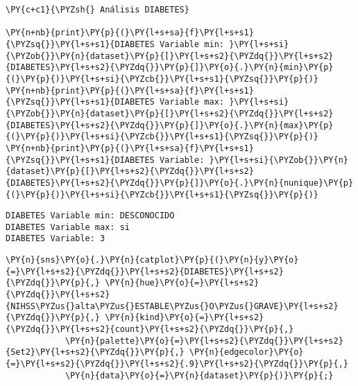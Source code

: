     \begin{tcolorbox}[breakable, size=fbox, boxrule=1pt, pad at break*=1mm,colback=cellbackground, colframe=cellborder]
\begin{Verbatim}[commandchars=\\\{\}]
\PY{c+c1}{\PYZsh{} Análisis DIABETES}

\PY{n+nb}{print}\PY{p}{(}\PY{l+s+sa}{f}\PY{l+s+s1}{\PYZsq{}}\PY{l+s+s1}{DIABETES Variable min: }\PY{l+s+si}{\PYZob{}}\PY{n}{dataset}\PY{p}{[}\PY{l+s+s2}{\PYZdq{}}\PY{l+s+s2}{DIABETES}\PY{l+s+s2}{\PYZdq{}}\PY{p}{]}\PY{o}{.}\PY{n}{min}\PY{p}{(}\PY{p}{)}\PY{l+s+si}{\PYZcb{}}\PY{l+s+s1}{\PYZsq{}}\PY{p}{)}
\PY{n+nb}{print}\PY{p}{(}\PY{l+s+sa}{f}\PY{l+s+s1}{\PYZsq{}}\PY{l+s+s1}{DIABETES Variable max: }\PY{l+s+si}{\PYZob{}}\PY{n}{dataset}\PY{p}{[}\PY{l+s+s2}{\PYZdq{}}\PY{l+s+s2}{DIABETES}\PY{l+s+s2}{\PYZdq{}}\PY{p}{]}\PY{o}{.}\PY{n}{max}\PY{p}{(}\PY{p}{)}\PY{l+s+si}{\PYZcb{}}\PY{l+s+s1}{\PYZsq{}}\PY{p}{)}
\PY{n+nb}{print}\PY{p}{(}\PY{l+s+sa}{f}\PY{l+s+s1}{\PYZsq{}}\PY{l+s+s1}{DIABETES Variable: }\PY{l+s+si}{\PYZob{}}\PY{n}{dataset}\PY{p}{[}\PY{l+s+s2}{\PYZdq{}}\PY{l+s+s2}{DIABETES}\PY{l+s+s2}{\PYZdq{}}\PY{p}{]}\PY{o}{.}\PY{n}{nunique}\PY{p}{(}\PY{p}{)}\PY{l+s+si}{\PYZcb{}}\PY{l+s+s1}{\PYZsq{}}\PY{p}{)}
\end{Verbatim}
\end{tcolorbox}

    \begin{Verbatim}[commandchars=\\\{\}]
DIABETES Variable min: DESCONOCIDO
DIABETES Variable max: si
DIABETES Variable: 3
    \end{Verbatim}

    \begin{tcolorbox}[breakable, size=fbox, boxrule=1pt, pad at break*=1mm,colback=cellbackground, colframe=cellborder]
\begin{Verbatim}[commandchars=\\\{\}]
\PY{n}{sns}\PY{o}{.}\PY{n}{catplot}\PY{p}{(}\PY{n}{y}\PY{o}{=}\PY{l+s+s2}{\PYZdq{}}\PY{l+s+s2}{DIABETES}\PY{l+s+s2}{\PYZdq{}}\PY{p}{,} \PY{n}{hue}\PY{o}{=}\PY{l+s+s2}{\PYZdq{}}\PY{l+s+s2}{NIHSS\PYZus{}alta\PYZus{}ESTABLE\PYZus{}O\PYZus{}GRAVE}\PY{l+s+s2}{\PYZdq{}}\PY{p}{,} \PY{n}{kind}\PY{o}{=}\PY{l+s+s2}{\PYZdq{}}\PY{l+s+s2}{count}\PY{l+s+s2}{\PYZdq{}}\PY{p}{,}
            \PY{n}{palette}\PY{o}{=}\PY{l+s+s2}{\PYZdq{}}\PY{l+s+s2}{Set2}\PY{l+s+s2}{\PYZdq{}}\PY{p}{,} \PY{n}{edgecolor}\PY{o}{=}\PY{l+s+s2}{\PYZdq{}}\PY{l+s+s2}{.9}\PY{l+s+s2}{\PYZdq{}}\PY{p}{,}
            \PY{n}{data}\PY{o}{=}\PY{n}{dataset}\PY{p}{)}\PY{p}{;}
\end{Verbatim}
\end{tcolorbox}

